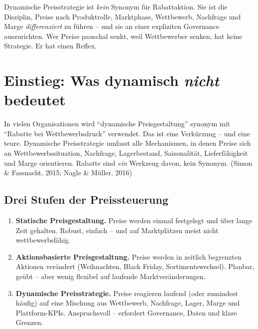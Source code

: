 \documentclass[11pt,a4paper,oneside]{article}
\newcommand{\fachbegriff}[1]{\textbf{#1}}
\newcommand{\quelle}[1]{{\footnotesize\color{lpGray}(#1)}}
\begin{document}
\begin{merkbox}
Dynamische Preisstrategie ist \emph{kein} Synonym für Rabattaktion. Sie ist die Disziplin, Preise nach Produktrolle, Marktphase, Wettbewerb, Nachfrage und Marge \emph{differenziert} zu führen -- und sie an einer expliziten Governance auszurichten. Wer Preise pauschal senkt, weil Wettbewerber senken, hat keine Strategie. Er hat einen Reflex.
\end{merkbox}

\clearpage

\section{Einstieg: Was dynamisch \emph{nicht} bedeutet}

In vielen Organisationen wird ``dynamische Preisgestaltung'' synonym mit ``Rabatte bei Wettbewerbsdruck'' verwendet. Das ist eine Verkürzung -- und eine teure. Dynamische Preisstrategie umfasst alle Mechanismen, in denen Preise sich an Wettbewerbssituation, Nachfrage, Lagerbestand, Saisonalität, Lieferfähigkeit und Marge orientieren. Rabatte sind \emph{ein} Werkzeug davon, kein Synonym. \quelle{Simon \& Fassnacht, 2015; Nagle \& Müller, 2016}

\subsection{Drei Stufen der Preissteuerung}

\begin{enumerate}
  \item \fachbegriff{Statische Preisgestaltung.} Preise werden einmal festgelegt und über lange Zeit gehalten. Robust, einfach -- und auf Marktplätzen meist nicht wettbewerbsfähig.
  \item \fachbegriff{Aktionsbasierte Preisgestaltung.} Preise werden in zeitlich begrenzten Aktionen verändert (Weihnachten, Black Friday, Sortimentswechsel). Planbar, geübt -- aber wenig flexibel auf laufende Marktveränderungen.
  \item \fachbegriff{Dynamische Preisstrategie.} Preise reagieren laufend (oder zumindest häufig) auf eine Mischung aus Wettbewerb, Nachfrage, Lager, Marge und Plattform-KPIs. Anspruchsvoll -- erfordert Governance, Daten und klare Grenzen.
\end{enumerate}
\end{document}
